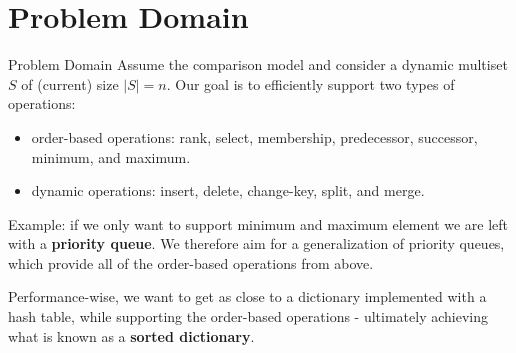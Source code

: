 \documentclass[aspectratio=169,xcolor=dvipsnames]{beamer}
\begin{document}
\section{Problem Domain}
\begin{frame}{Problem Domain}
    Assume the comparison model and consider a dynamic multiset $S$ of (current) size $|S|=n$. Our goal is to efficiently support two types of operations:

    \begin{itemize}
        \item order-based operations: rank, select, membership, predecessor, successor, minimum, and maximum.
        \item dynamic operations: insert, delete, change-key, split, and merge.
    \end{itemize}

    \vspace{0.5cm}

    Example: if we only want to support minimum and maximum element we are left with a \textbf{priority queue}. 
    We therefore aim for a generalization of priority queues, which provide all of the order-based operations from above.

    \vspace{0.25cm}

    Performance-wise, we want to get as close to a dictionary implemented with a hash table, while supporting the order-based operations
    - ultimately achieving what is known as a \textbf{sorted dictionary}.
\end{frame}

\end{document}
